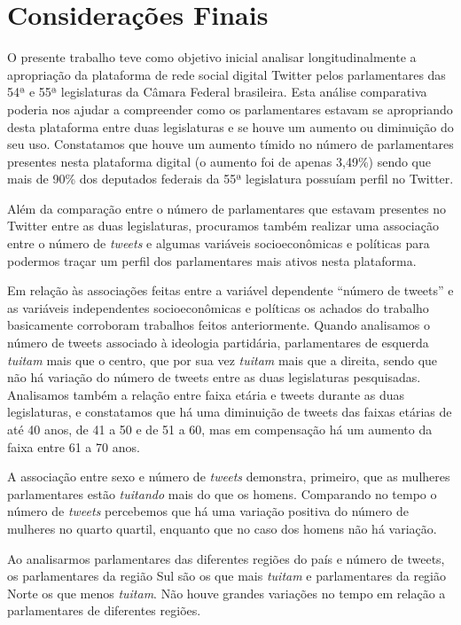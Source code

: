 \section{Considerações Finais}

\noindent{}O presente trabalho teve como objetivo inicial analisar
longitudinalmente a apropriação da plataforma de rede social digital
Twitter pelos parlamentares das 54ª e 55ª legislaturas da Câmara Federal
brasileira. Esta análise comparativa poderia nos ajudar a compreender
como os parlamentares estavam se apropriando desta plataforma entre duas
legislaturas e se houve um aumento ou diminuição do seu uso. Constatamos
que houve um aumento tímido no número de parlamentares presentes nesta
plataforma digital (o aumento foi de apenas 3,49\%) sendo que mais de
90\% dos deputados federais da 55ª legislatura possuíam perfil no
Twitter.

Além da comparação entre o número de parlamentares que estavam presentes
no Twitter entre as duas legislaturas, procuramos também realizar uma
associação entre o número de \emph{tweets} e algumas variáveis
socioeconômicas e políticas para podermos traçar um perfil dos
parlamentares mais ativos nesta plataforma.

Em relação às associações feitas entre a variável dependente ``número de
tweets'' e as variáveis independentes socioeconômicas e políticas os
achados do trabalho basicamente corroboram trabalhos feitos
anteriormente. Quando analisamos o número de tweets associado à
ideologia partidária, parlamentares de esquerda \emph{tuitam} mais que o
centro, que por sua vez \emph{tuitam} mais que a direita, sendo que não
há variação do número de tweets entre as duas legislaturas pesquisadas.
Analisamos também a relação entre faixa etária e tweets durante as duas
legislaturas, e constatamos que há uma diminuição de tweets das faixas
etárias de até 40 anos, de 41 a 50 e de 51 a 60, mas em compensação há
um aumento da faixa entre 61 a 70 anos.

A associação entre sexo e número de \emph{tweets} demonstra, primeiro,
que as mulheres parlamentares estão \emph{tuitando} mais do que os
homens. Comparando no tempo o número de \emph{tweets} percebemos que há
uma variação positiva do número de mulheres no quarto quartil, enquanto
que no caso dos homens não há variação.

Ao analisarmos parlamentares das diferentes regiões do país e número de
tweets, os parlamentares da região Sul são os que mais \emph{tuitam} e
parlamentares da região Norte os que menos \emph{tuitam}. Não houve
grandes variações no tempo em relação a parlamentares de diferentes
regiões.

